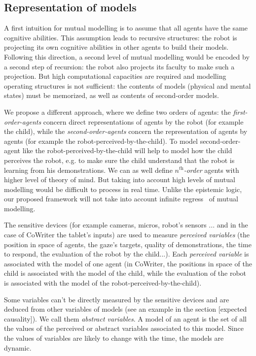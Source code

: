 \documentclass[conference]{IEEEtran}
\begin{document}
\subsection{Representation of models}
A first intuition for mutual modelling is to assume that all agents have the same cognitive abilities. This assumption leads to recursive structures: the robot is projecting its own cognitive abilities in other agents to build their models.  Following this direction, a second level of mutual modelling would be encoded by a second step of recursion: the robot also projects its faculty to make such a projection. But high computational capacities are required and modelling operating structures is not sufficient: the contents of models (physical and mental states) must be memorized, as well as contents of second-order models. 

We propose a different approach, where we define two orders of agents: the \textit{first-order-agents} concern direct representations of agents by the robot (for example the child), while the \textit{second-order-agents} concern the representation of agents by agents (for example the robot-perceived-by-the-child). 
To model second-order-agent like the robot-perceived-by-the-child will help to model how the child perceives the robot, e.g. to make sure the child understand that the robot is learning from his demonstrations. 
We can as well define \textit{$n^{\textit{th}}$-order} agents with higher level of theory of mind. But taking into account high levels of mutual modelling would be difficult to process in real time. Unlike the epistemic logic, our proposed framework will not take into account infinite regress~\cite{clark1991grounding} of mutual modelling. 

The sensitive devices (for example cameras, micros, robot's sensors ... and in the case of CoWriter the tablet's inputs) are used to measure \textit{perceived variables} (the position in space of agents, the gaze's targets, quality of demonstrations, the time to respond, the evaluation of the robot by the child...). Each \textit{perceived variable} is associated with the model of one agent (in CoWriter, the positions in space of the child is associated with the model of the child, while the evaluation of the robot is associated with the model of the robot-perceived-by-the-child). 

Some variables can't be directly measured by the sensitive devices and are deduced from other variables of models (see an example in the section [expected causality]). We call them \textit{abstract variables}. 
A model of an agent is the set of all the values of the perceived or abstract variables associated to this model. Since the values of variables are likely to change with the time, the models are dynamic.
\end{document}
